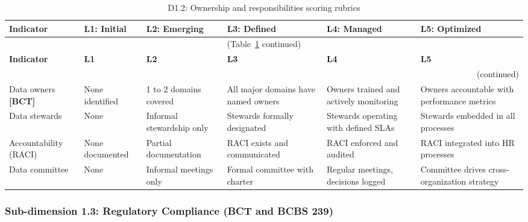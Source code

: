 \begin{center}
{\small
\begin{longtable}{|p{2.4cm}|p{2.0cm}|p{2.0cm}|p{2.2cm}|p{2.2cm}|p{2.2cm}|}
\caption{D1.2: Ownership and responsibilities scoring rubrics} \label{tab:d1-2} \\
\hline
\textbf{Indicator} & \textbf{L1: Initial} & \textbf{L2: Emerging} & \textbf{L3: Defined} & \textbf{L4: Managed} & \textbf{L5: Optimized} \\
\hline
\endfirsthead
\multicolumn{6}{c}{\small (Table~\ref{tab:d1-2} continued)} \\
\hline
\textbf{Indicator} & \textbf{L1} & \textbf{L2} & \textbf{L3} & \textbf{L4} & \textbf{L5} \\
\hline
\endhead
\hline
\multicolumn{6}{r}{\small (continued)} \\
\endfoot
\hline
\endlastfoot
Data owners \textbf{[BCT]} &
  None identified &
  1 to 2 domains covered &
  All major domains have named owners &
  Owners trained and actively monitoring &
  Owners accountable with performance metrics \\
\hline
Data stewards &
  None &
  Informal stewardship only &
  Stewards formally designated &
  Stewards operating with defined SLAs &
  Stewards embedded in all processes \\
\hline
Accountability (RACI) &
  None documented &
  Partial documentation &
  RACI exists and communicated &
  RACI enforced and audited &
  RACI integrated into HR processes \\
\hline
Data committee &
  None &
  Informal meetings only &
  Formal committee with charter &
  Regular meetings, decisions logged &
  Committee drives cross-organization strategy \\
\hline
\end{longtable}
}
\end{center}

\subsubsection*{Sub-dimension 1.3: Regulatory Compliance (BCT and BCBS 239)}


